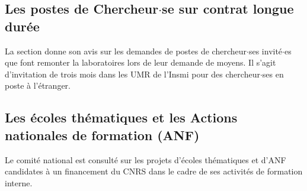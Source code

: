 \subsection{Les postes de Chercheur$\cdot$se sur contrat longue dur\'ee}

La section donne son avis sur les demandes de postes de chercheur$\cdot$ses invit\'e$\cdot$es que font remonter la laboratoires lors de leur demande de moyens. Il s'agit d'invitation de trois mois dans les UMR de l'Insmi pour des chercheur$\cdot$ses en poste \`a l'\'etranger. 


\subsection{Les \'ecoles th\'ematiques et les Actions nationales de formation (ANF)}
%
Le comit\'e national est consult\'e sur les projets d'\'ecoles th\'ematiques et d'ANF candidates \`a un financement du CNRS dans le cadre de ses activit\'es de formation interne.


